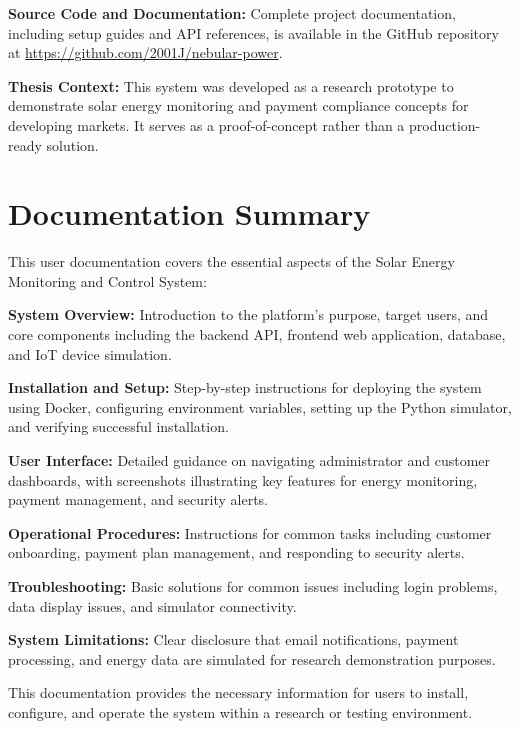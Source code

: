 \textbf{Source Code and Documentation:} Complete project documentation, including setup guides and API references, is available in the GitHub repository at \url{https://github.com/2001J/nebular-power}.

\textbf{Thesis Context:} This system was developed as a research prototype to demonstrate solar energy monitoring and payment compliance concepts for developing markets. It serves as a proof-of-concept rather than a production-ready solution.

\section{Documentation Summary}
\label{sec:documentation-summary}

This user documentation covers the essential aspects of the Solar Energy Monitoring and Control System:

\textbf{System Overview:} Introduction to the platform's purpose, target users, and core components including the backend API, frontend web application, database, and IoT device simulation.

\textbf{Installation and Setup:} Step-by-step instructions for deploying the system using Docker, configuring environment variables, setting up the Python simulator, and verifying successful installation.

\textbf{User Interface:} Detailed guidance on navigating administrator and customer dashboards, with screenshots illustrating key features for energy monitoring, payment management, and security alerts.

\textbf{Operational Procedures:} Instructions for common tasks including customer onboarding, payment plan management, and responding to security alerts.

\textbf{Troubleshooting:} Basic solutions for common issues including login problems, data display issues, and simulator connectivity.

\textbf{System Limitations:} Clear disclosure that email notifications, payment processing, and energy data are simulated for research demonstration purposes.

This documentation provides the necessary information for users to install, configure, and operate the system within a research or testing environment.

